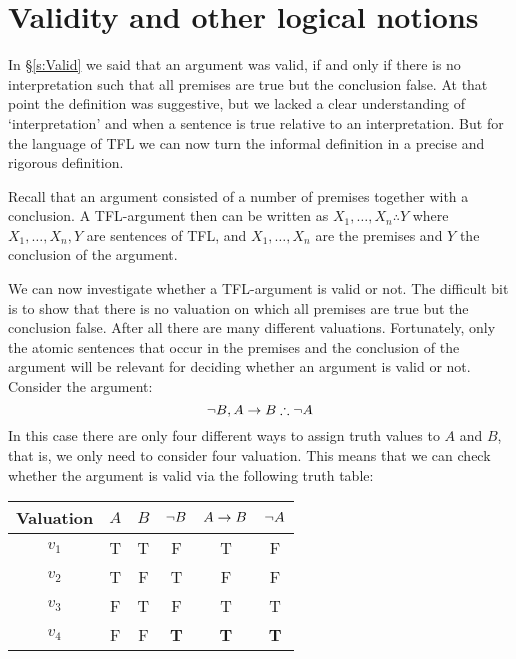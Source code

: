  \section{Validity and other logical notions}\label{sec:valtt}
 In \S\ref{s:Valid} we said that an argument was valid, if and only if there is no interpretation such that all premises are true but the conclusion false. At that point the definition was suggestive, but we lacked a clear understanding of `interpretation' and when a sentence is true relative to an interpretation. But for the language of TFL we can now turn the informal definition in a precise and rigorous definition.

 Recall that an argument consisted of a number of premises together with a conclusion. A TFL-argument then can be written as $X_1,\ldots,X_n\therefore Y$ where $X_1,\ldots,X_n, Y$ are sentences of TFL, and $X_1,\ldots,X_n$ are the premises and $Y$ the conclusion of the argument.


 We can now investigate whether a TFL-argument is valid or not. The difficult bit is to show that there is no valuation on which all premises are true but the conclusion false. After all there are many different valuations. Fortunately, only the atomic sentences that occur in the premises and the conclusion of the argument will be relevant for deciding whether an argument is valid or not. Consider the argument:
 $$\enot B,A\eif B\therefore\enot A$$
 In this case there are only four different ways to assign truth values to $A$ and $B$, that is, we only need to consider four valuation. This means that we can check whether the argument is valid via the following truth table:

 \begin{center}
\begin{tabular}{c|cc|c|c||c}
Valuation&$A$&$B$&$\neg B$&$A\rightarrow B$&$\neg A$\\\hline
$v_1$&T & T & F & T & F\\
$v_2$&T & F & T & F & F\\
$v_3$&F & T & F & T & T\\
$v_4$&F & F & \textbf{T}& \textbf{T} & \textbf{T}
\end{tabular}
\end{center}

